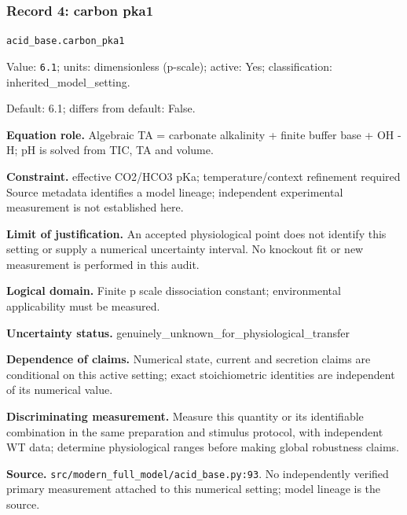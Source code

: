 \subsubsection*{Record 4: carbon pka1}
{\small \nolinkurl{acid_base.carbon_pka1}\par

Value: \texttt{6.1}; units: dimensionless (p-scale); active: Yes; classification: inherited\_model\_setting.\par

Default: 6.1; differs from default: False.\par

\textbf{Equation role.} Algebraic TA = carbonate alkalinity + finite buffer base + OH - H; pH is solved from TIC, TA and volume.\par

\textbf{Constraint.} effective CO2/HCO3 pKa; temperature/context refinement required Source metadata identifies a model lineage; independent experimental measurement is not established here.\par

\textbf{Limit of justification.} An accepted physiological point does not identify this setting or supply a numerical uncertainty interval. No knockout fit or new measurement is performed in this audit.\par

\textbf{Logical domain.} Finite p scale dissociation constant; environmental applicability must be measured.\par

\textbf{Uncertainty status.} genuinely\_unknown\_for\_physiological\_transfer\par

\textbf{Dependence of claims.} Numerical state, current and secretion claims are conditional on this active setting; exact stoichiometric identities are independent of its numerical value.\par

\textbf{Discriminating measurement.} Measure this quantity or its identifiable combination in the same preparation and stimulus protocol, with independent WT data; determine physiological ranges before making global robustness claims.\par

\textbf{Source.} \nolinkurl{src/modern_full_model/acid_base.py:93}. No independently verified primary measurement attached to this numerical setting; model lineage is the source.\par}

